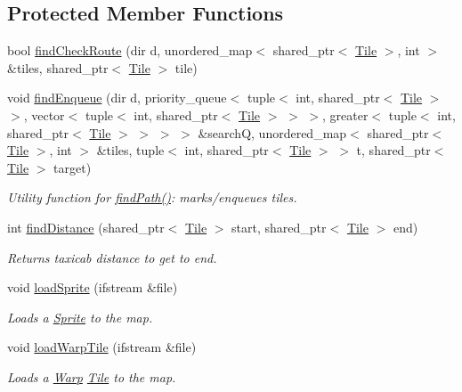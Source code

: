 \subsection*{Protected Member Functions}
\begin{DoxyCompactItemize}
\item 
bool \hyperlink{class_terr_a34bf50aa821f3c2f861c060281e238c3}{find\+Check\+Route} (dir d, unordered\+\_\+map$<$ shared\+\_\+ptr$<$ \hyperlink{class_tile}{Tile} $>$, int $>$ \&tiles, shared\+\_\+ptr$<$ \hyperlink{class_tile}{Tile} $>$ tile)
\item 
void \hyperlink{class_terr_a1784db5125ce598d59b68bb0edde9196}{find\+Enqueue} (dir d, priority\+\_\+queue$<$ tuple$<$ int, shared\+\_\+ptr$<$ \hyperlink{class_tile}{Tile} $>$ $>$, vector$<$ tuple$<$ int, shared\+\_\+ptr$<$ \hyperlink{class_tile}{Tile} $>$ $>$ $>$, greater$<$ tuple$<$ int, shared\+\_\+ptr$<$ \hyperlink{class_tile}{Tile} $>$ $>$ $>$ $>$ \&searchQ, unordered\+\_\+map$<$ shared\+\_\+ptr$<$ \hyperlink{class_tile}{Tile} $>$, int $>$ \&tiles, tuple$<$ int, shared\+\_\+ptr$<$ \hyperlink{class_tile}{Tile} $>$ $>$ t, shared\+\_\+ptr$<$ \hyperlink{class_tile}{Tile} $>$ target)\hypertarget{class_terr_a1784db5125ce598d59b68bb0edde9196}{}\label{class_terr_a1784db5125ce598d59b68bb0edde9196}

\begin{DoxyCompactList}\small\item\em Utility function for \hyperlink{class_terr_ad0596843b8e4c1ddd9b39220837b88ce}{find\+Path()}\+: marks/enqueues tiles. \end{DoxyCompactList}\item 
int \hyperlink{class_terr_a76e437b2864d6fd78b85961dbe1ade61}{find\+Distance} (shared\+\_\+ptr$<$ \hyperlink{class_tile}{Tile} $>$ start, shared\+\_\+ptr$<$ \hyperlink{class_tile}{Tile} $>$ end)\hypertarget{class_terr_a76e437b2864d6fd78b85961dbe1ade61}{}\label{class_terr_a76e437b2864d6fd78b85961dbe1ade61}

\begin{DoxyCompactList}\small\item\em Returns taxicab distance to get to end. \end{DoxyCompactList}\item 
void \hyperlink{class_terr_ac552835680026b818b202e40664ca25a}{load\+Sprite} (ifstream \&file)\hypertarget{class_terr_ac552835680026b818b202e40664ca25a}{}\label{class_terr_ac552835680026b818b202e40664ca25a}

\begin{DoxyCompactList}\small\item\em Loads a \hyperlink{class_sprite}{Sprite} to the map. \end{DoxyCompactList}\item 
void \hyperlink{class_terr_ade4dc4c2e3c5746d7274ff7849b60e38}{load\+Warp\+Tile} (ifstream \&file)\hypertarget{class_terr_ade4dc4c2e3c5746d7274ff7849b60e38}{}\label{class_terr_ade4dc4c2e3c5746d7274ff7849b60e38}

\begin{DoxyCompactList}\small\item\em Loads a \hyperlink{class_warp}{Warp} \hyperlink{class_tile}{Tile} to the map. \end{DoxyCompactList}\end{DoxyCompactItemize}
